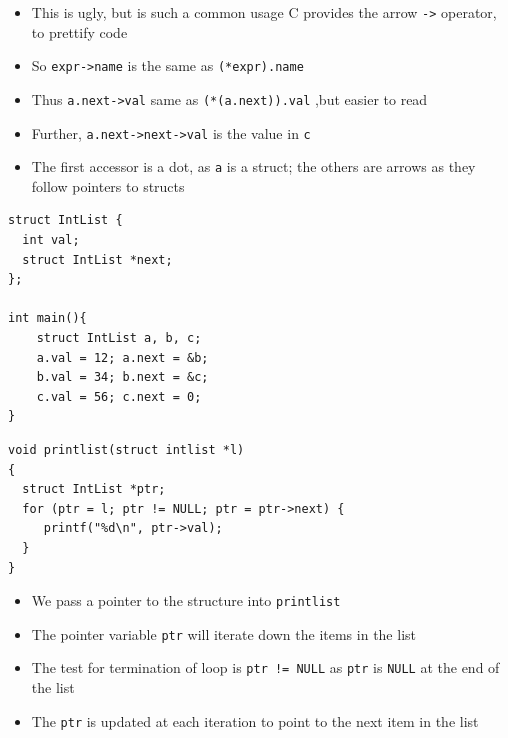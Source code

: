 \documentclass{beamer}
\def\code#1{{\ifmmode\else\large\fi\tt#1}}
\begin{document}
\begin{frame}[fragile]
\begin{itemize}
\item This is ugly, but is such a common usage C provides the arrow \code{->} operator, to prettify code
\item So \code{expr->name} is the same as \code{(*expr).name}
\bigskip
\item Thus \code{a.next->val} same as \code{(*(a.next)).val} ,but easier to read
\item Further, \code{a.next->next->val} is the value in \code{c}
\item The first accessor is a dot, as \code{a} is a struct; the others are arrows as they follow pointers to structs
\end{itemize}
\end{frame}

\begin{frame}[fragile]
\begin{block}{}
\begin{lstlisting}
struct IntList {
  int val;
  struct IntList *next;
};

int main(){
    struct IntList a, b, c;
    a.val = 12; a.next = &b;
    b.val = 34; b.next = &c;
    c.val = 56; c.next = 0;
}
\end{lstlisting}
\end{block}
\end{frame}

\begin{frame}[fragile]
\begin{block}{}
\begin{lstlisting}
void printlist(struct intlist *l)
{
  struct IntList *ptr;
  for (ptr = l; ptr != NULL; ptr = ptr->next) {
     printf("%d\n", ptr->val);
  }
}
\end{lstlisting}
\end{block}
\end{frame}

\begin{frame}[fragile]
\begin{itemize}
\item We pass a pointer to the structure into \code{printlist}
\item The pointer variable \code{ptr} will iterate down the items in the list
\item The test for termination of loop is \code{ptr != NULL} as \code{ptr} is \code{NULL} at the end of the list
\item The \code{ptr} is updated at each iteration to point to the next item in the list
\end{itemize}
\end{frame}
\end{document}

